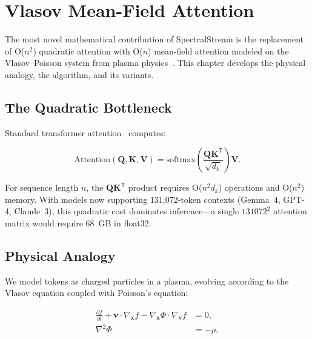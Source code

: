 \documentclass[11pt,a4paper,openright]{book}
\begin{document}
\chapter{Vlasov Mean-Field Attention}
\label{ch:vlasov}

The most novel mathematical contribution of SpectralStream is the replacement of O($n^2$) quadratic attention with O($n$) mean-field attention modeled on the Vlasov--Poisson system from plasma physics~\cite{vlasov1968vlasov}. This chapter develops the physical analogy, the algorithm, and its variants.

\section{The Quadratic Bottleneck}

Standard transformer attention~\cite{vaswani2017attention} computes:

\begin{equation}
	\label{eq:standard_attn}
	\text{Attention}(\mathbf{Q}, \mathbf{K}, \mathbf{V}) = \text{softmax}\left(\frac{\mathbf{Q}\mathbf{K}^\mathsf{T}}{\sqrt{d_k}}\right)\mathbf{V}.
\end{equation}

For sequence length $n$, the $\mathbf{Q}\mathbf{K}^\mathsf{T}$ product requires O($n^2 d_k$) operations and O($n^2$) memory. With models now supporting 131,072-token contexts (Gemma~4, GPT-4, Claude~3), this quadratic cost dominates inference---a single $131072^2$ attention matrix would require 68~GB in float32.

\section{Physical Analogy}

We model tokens as charged particles in a plasma, evolving according to the Vlasov equation coupled with Poisson's equation:

\begin{align}
	\label{eq:vlasov}
	\frac{\partial f}{\partial t} + \mathbf{v} \cdot \nabla_{\mathbf{x}} f - \nabla_{\mathbf{x}} \Phi \cdot \nabla_{\mathbf{v}} f & = 0,     \\
	\label{eq:poisson}
	\nabla^2 \Phi                                                                                                                 & = -\rho,
\end{align}
\end{document}
